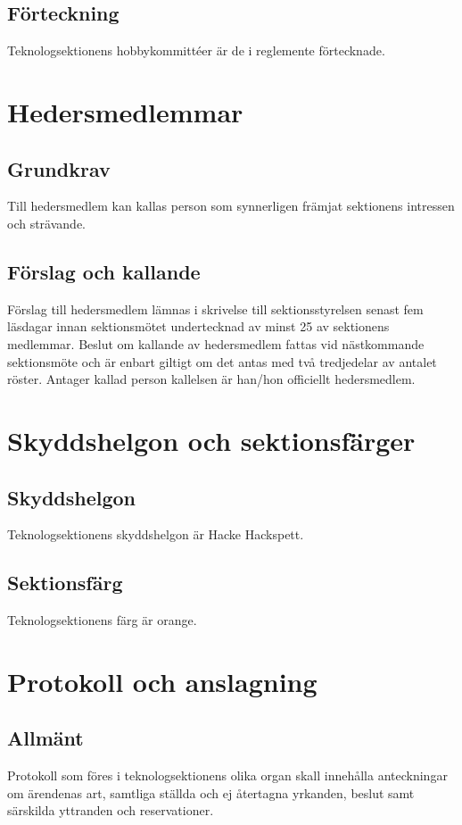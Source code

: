\documentclass[a4paper]{dtek}
\begin{document}
\subsection{Förteckning}
Teknologsektionens hobbykommittéer är de i reglemente förtecknade.
\newpage

\section{Hedersmedlemmar}
\subsection{Grundkrav}
Till hedersmedlem kan kallas person som synnerligen främjat sektionens intressen och strävande.
\subsection{Förslag och kallande}
Förslag till hedersmedlem lämnas i skrivelse till sektionsstyrelsen senast fem läsdagar innan sektionsmötet undertecknad av minst 25 av sektionens medlemmar. Beslut om kallande av hedersmedlem fattas vid nästkommande sektionsmöte och är enbart giltigt om det antas med två tredjedelar av antalet röster. Antager kallad person kallelsen är han/hon officiellt hedersmedlem.
\newpage

\section{Skyddshelgon och sektionsfärger}
\subsection{Skyddshelgon}
Teknologsektionens skyddshelgon är Hacke Hackspett.
\subsection{Sektionsfärg}
Teknologsektionens färg är orange.
\newpage

\section{Protokoll och anslagning}
\subsection{Allmänt}
Protokoll som föres i teknologsektionens olika organ skall innehålla anteckningar om ärendenas art, samtliga ställda och ej återtagna yrkanden, beslut samt särskilda yttranden och reservationer.
\end{document}
